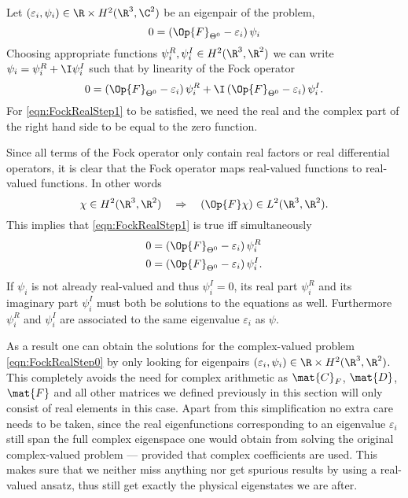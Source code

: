 \noindent
Let $(\varepsilon_i, \psi_i) \in \R \times H^2(\R^3, \C^2)$ be an eigenpair
of the \HF problem, \ie
\begin{equation}
	 0 = \left(\Op{F}_{\Theta^0} - \varepsilon_i \right) \psi_i
	\label{eqn:FockRealStep0}
\end{equation}
Choosing appropriate functions $\psi_i^R, \psi_i^I \in H^2(\R^3, \R^2)$
we can write $\psi_i = \psi_i^R + \I \psi_i^I$ such that
by linearity of the Fock operator
\begin{equation}
0 = \left(\Op{F}_{\Theta^0} - \varepsilon_i \right) \psi_i^R
	+ \I \left(\Op{F}_{\Theta^0} - \varepsilon_i \right) \psi_i^I.
	\label{eqn:FockRealStep1}
\end{equation}
For \eqref{eqn:FockRealStep1} to be satisfied,
we need the real and the complex part of the right hand side
to be equal to the zero function.

Since all terms of the Fock operator only contain real factors
or real differential operators,
it is clear that the Fock operator maps real-valued functions
to real-valued functions.
In other words
\[ \chi \in H^2(\R^3, \R^2) \quad \Rightarrow \quad \left(\Op{F} \chi\right) \in L^2(\R^3, \R^2). \]
This implies that \eqref{eqn:FockRealStep1} is true iff simultaneously
\begin{align}
	0 &= \left(\Op{F}_{\Theta^0} - \varepsilon_i \right) \psi_i^R \\
	0 &= \left(\Op{F}_{\Theta^0} - \varepsilon_i \right) \psi_i^I.
\end{align}
If $\psi_i$ is not already real-valued and thus $\psi_i^I = 0$,
its real part $\psi_i^R$ and its imaginary part $\psi_i^I$ must both be
solutions to the \HF equations as well.
Furthermore $\psi_i^R$ and $\psi_i^I$ are associated to the same
eigenvalue $\varepsilon_i$ as $\psi$.

As a result one can obtain the solutions for the complex-valued problem
\eqref{eqn:FockRealStep0} by only looking for eigenpairs
$(\varepsilon_i, \psi_i) \in \R \times H^2(\R^3, \R^2)$.
This completely avoids the need for complex arithmetic
as $\mat{C}_F$, $\mat{D}$, $\mat{F}$ and all other matrices
we defined previously in this section will only consist of real elements in this case.
Apart from this simplification no extra care needs to be taken,
since the real eigenfunctions corresponding to an eigenvalue $\varepsilon_i$
still span the full complex eigenspace
one would obtain from solving the original complex-valued problem
--- provided that complex coefficients are used.
This makes sure that we neither miss anything nor get
spurious results by using a real-valued ansatz,
thus still get exactly the physical eigenstates we are after.

